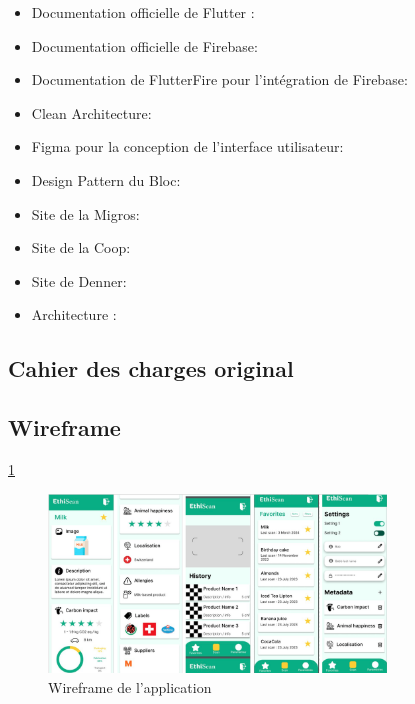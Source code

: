 \begin{itemize}[noitemsep]
    \item Documentation officielle de Flutter : \cite{flutterDocs}
    \item Documentation officielle de Firebase: \cite{firebaseDocs}
    \item Documentation de FlutterFire pour l'intégration de Firebase: \cite{flutterFireDocs}
    \item Clean Architecture: \cite{cleanArchitecture}
    \item Figma pour la conception de l'interface utilisateur: \cite{figma}
    \item Design Pattern du Bloc: \cite{blocPattern}
    \item Site de la Migros: \cite{migros}
    \item Site de la Coop: \cite{coop}
    \item Site de Denner: \cite{denner}
    \item Architecture : \cite{googleCloudArchitecture}
\end{itemize}


\subsection{Cahier des charges original}



\subsection{Wireframe}
\ref{doc:wireframe}

\begin{figure}[H]
    \centering
    \includegraphics[width=0.8\textwidth]{images/wireframe.png}
    \caption{Wireframe de l'application}
    \label{doc:wireframe}
\end{figure}

